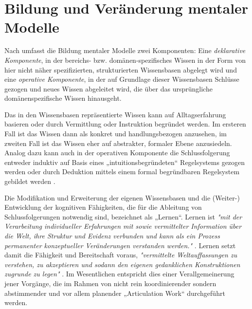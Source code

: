 \section{Bildung und Veränderung mentaler Modelle} %
\label{sec:bildung_mentaler_modelle}

Nach \citet{Seel91} umfasst die Bildung mentaler Modelle zwei Komponenten: Eine \emph{deklarative Komponente}, in der bereichs- bzw. domänen-spezifisches Wissen in der Form von hier nicht näher spezifizierten, strukturierten Wissensbasen abgelegt wird und eine \emph{operative Komponente}, in der auf Grundlage dieser Wissensbasen Schlüsse gezogen und neues Wissen abgeleitet wird, die über das ursprüngliche domänenspezifische Wissen hinausgeht. 

Das in den Wissensbasen repräsentierte Wissen kann auf Alltagserfahrung basieren oder durch Vermittlung oder Instruktion begründet werden. Im ersteren Fall ist das Wissen dann als konkret und handlungsbezogen anzusehen, im zweiten Fall ist das Wissen eher auf abstrakter, formaler Ebene anzusiedeln. Analog dazu kann auch in der operativen Komponente die Schlussfolgerung entweder induktiv auf Basis eines „intuitionsbegründeten“ Regelsystems gezogen werden oder durch Deduktion mittels einem formal begründbaren Regelsystem gebildet werden \citep{Seel91}. 

Die Modifikation und Erweiterung der eigenen Wissensbasen und die (Weiter-) Entwicklung der kognitiven Fähigkeiten, die für die Ableitung von Schlussfolgerungen notwendig sind, bezeichnet \citet{Seel91} als „Lernen“. Lernen ist \emph{"mit der Verarbeitung individueller Erfahrungen mit sowie vermittelter Information über die Welt, ihre Struktur und Evidenz verbunden und kann als ein Prozess permanenter konzeptueller Veränderungen verstanden werden."} \citep[][S. 23]{Seel91}. Lernen setzt damit die Fähigkeit und Bereitschaft voraus, \emph{"vermittelte Weltauffassungen zu verstehen, zu akzeptieren und sodann den eigenen gedanklichen Konstruktionen zugrunde zu legen"} \citep[][S. 23]{Seel91}. Im Wesentlichen entspricht dies einer Verallgemeinerung jener Vorgänge, die im Rahmen von nicht rein koordinierender sondern abstimmender und vor allem planender „Articulation Work“ durchgeführt werden.

